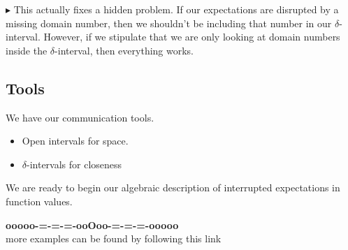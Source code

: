 \documentclass{ximera}
\begin{document}
$\blacktriangleright$ This actually fixes a hidden problem.  If our expectations are disrupted by a missing domain number, then we shouldn't be including that number in our $\delta$-interval.  However, if we stipulate that we are only looking at domain numbers inside the $\delta$-interval, then everything works. \\




\subsection*{Tools}


We have our communication tools.

\begin{itemize}
\item Open intervals for space.
\item $\delta$-intervals for closeness
\end{itemize}


We are ready to begin our algebraic description of interrupted expectations in function values. 



















\begin{onlineOnly}
\begin{center}
\textbf{\textcolor{green!50!black}{ooooo-=-=-=-ooOoo-=-=-=-ooooo}} \\

more examples can be found by following this link\\ 

\end{center}
\end{onlineOnly}
\end{document}
